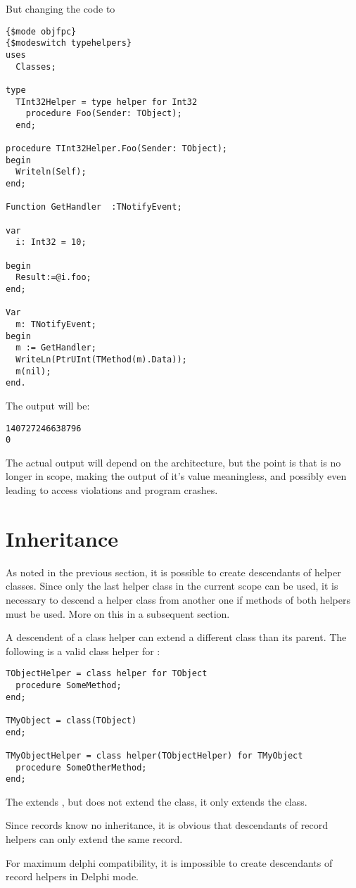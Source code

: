 But changing the code to
\begin{verbatim}
{$mode objfpc}
{$modeswitch typehelpers}
uses
  Classes;

type
  TInt32Helper = type helper for Int32
    procedure Foo(Sender: TObject);
  end;

procedure TInt32Helper.Foo(Sender: TObject);
begin
  Writeln(Self);
end;

Function GetHandler  :TNotifyEvent;

var
  i: Int32 = 10;
  
begin
  Result:=@i.foo;
end;

Var
  m: TNotifyEvent;
begin
  m := GetHandler;
  WriteLn(PtrUInt(TMethod(m).Data));
  m(nil);
end.
\end{verbatim}
The output will be:
\begin{verbatim}
140727246638796
0
\end{verbatim}
The actual output will depend on the architecture, but the point is that  is no longer in scope, 
making the output of it's value meaningless, and  possibly even leading to access violations and program crashes.

\section{Inheritance}
As noted in the previous section, it is possible to create descendants of
helper classes. Since only the last helper class in the current scope can 
be used, it is necessary to descend a helper class from another one if
methods of both helpers must be used. More on this in a subsequent section.

A descendent of a class helper can extend a different class than its
parent. The following is a valid class helper for :
\begin{verbatim}
TObjectHelper = class helper for TObject
  procedure SomeMethod;
end;
 
TMyObject = class(TObject)
end;
 
TMyObjectHelper = class helper(TObjectHelper) for TMyObject
  procedure SomeOtherMethod;
end;
\end{verbatim}
The  extends , but does not extend
the  class, it only extends the  class.

Since records know no inheritance, it is obvious that descendants of record
helpers can only extend the same record.

\begin{remark}
For maximum delphi compatibility, it is impossible to create descendants of record helpers
in Delphi mode.
\end{remark}

